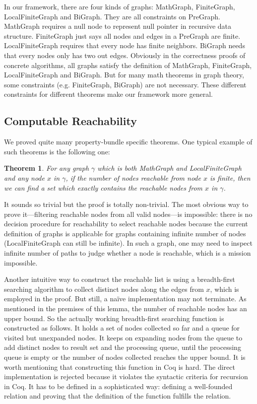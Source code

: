 In our framework, there are four kinds of graphs: MathGraph,
FiniteGraph, LocalFiniteGraph and BiGraph. They are all constraints on
PreGraph. MathGraph requires a null node to represent null pointer in
recursive data structure. FiniteGraph just says all nodes and edges in
a PreGraph are finite. LocalFiniteGraph requires that every node has
finite neighbors. BiGraph needs that every nodes only has two out
edges. Obviously in the correctness proofs of concrete algorithms, all
graphs satisfy the definition of MathGraph, FiniteGraph,
LocalFiniteGraph and BiGraph. But for many math theorems in graph
theory, some constraints (e.g. FiniteGraph, BiGraph) are not
necessary. These different constraints for different theorems make our
framework more general.

\subsection{Computable Reachability}
We proved quite many property-bundle specific theorems. One typical
example of such theorems is the following one:
\newtheorem{mythm}{Theorem}
\begin{mythm}
For any graph $\gamma$ which is both MathGraph and LocalFiniteGraph
and any node $x$ in $\gamma$, if the number of nodes reachable from
node $x$ is finite, then we can find a set which exactly contains the
reachable nodes from $x$ in $\gamma$.
\end{mythm}
It sounds so trivial but the proof is totally non-trivial. The most
obvious way to prove it---filtering reachable nodes from all valid
nodes---is impossible: there is no decision procedure for reachability
to select reachable nodes because the current definition of graphs is
applicable for graphs containing infinite number of nodes
(LocalFiniteGraph can still be infinite). In such a graph, one may
need to inspect infinite number of paths to judge whether a node is
reachable, which is a mission impossible.

Another intuitive way to construct the reachable list is using a
breadth-first searching algorithm to collect distinct nodes along the
edges from $x$, which is employed in the proof. But still, a na\"ive
implementation may not terminate. As mentioned in the premises of this
lemma, the number of reachable nodes has an upper bound. So the
actually working breadth-first searching function is constructed as
follows. It holds a set of nodes collected so far and a queue for
visited but unexpanded nodes. It keeps on expanding nodes from the
queue to add distinct nodes to result set and the processing queue,
until the processing queue is empty or the number of nodes collected
reaches the upper bound. It is worth mentioning that constructing this
function in Coq is hard. The direct implementation is rejected because
it violates the syntactic criteria for recursion in Coq. It has to be
defined in a sophisticated way: defining a well-founded relation and
proving that the definition of the function fulfills the relation.

